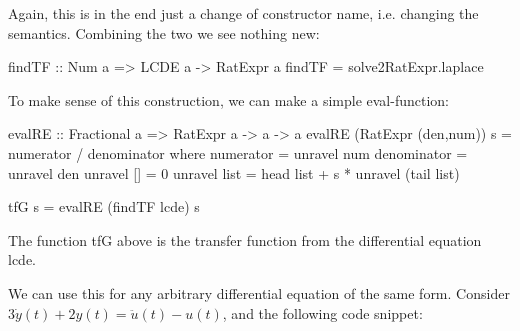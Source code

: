 Again, this is in the end just a change of constructor name, i.e. changing the %
semantics. Combining the two we see nothing new:

\begin{code}
findTF :: Num a => LCDE a -> RatExpr a
findTF = solve2RatExpr.laplace
\end{code}

To make sense of this construction, we can make a simple eval-function:

\begin{code}
evalRE :: Fractional a => RatExpr a -> a -> a
evalRE (RatExpr (den,num)) s = numerator / denominator where
  numerator   = unravel num
  denominator = unravel den
  unravel []   = 0
  unravel list = head list + s * unravel (tail list)

tfG s = evalRE (findTF lcde) s
\end{code}

The function tfG above is the transfer function from the differential equation lcde.

We can use this for any arbitrary differential equation of the same form. Consider $3\dot{y}(t)+2y(t)=\ddot{u}(t)-u(t)$, and the following code snippet:




\LNReset